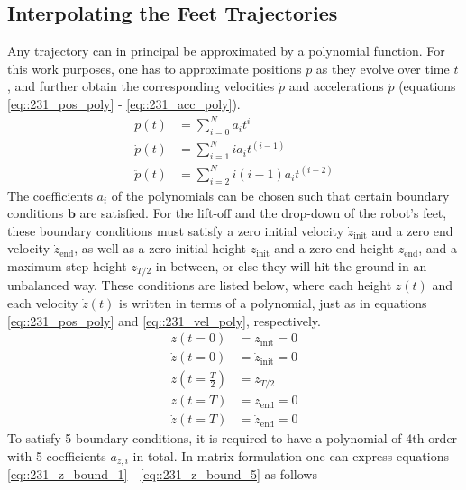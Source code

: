 \FloatBarrier
\subsection{Interpolating the Feet Trajectories}
Any trajectory can in principal be approximated by a polynomial function. For this work purposes, one has to approximate positions $p$ as they evolve over time $t$, and further obtain the corresponding velocities $\dot{p}$ and accelerations $\ddot{p}$ (equations \ref{eq::231_pos_poly} - \ref{eq::231_acc_poly}).  
\begin{align}
	p(t) &= \sum_{i = 0}^{N}a_it^i 
	\label{eq::231_pos_poly}\\
	\dot{p}(t) &= \sum_{i = 1}^{N}ia_it^{(i-1)} 
	\label{eq::231_vel_poly}\\
	\ddot{p}(t) &= \sum_{i = 2}^{N}i(i-1)a_it^{(i-2)}
	\label{eq::231_acc_poly}
\end{align}
The coefficients $a_i$ of the polynomials can be chosen such that certain boundary conditions $\bm{b}$ are satisfied. For the lift-off and the drop-down of the robot's feet, these boundary conditions must satisfy a zero initial velocity $\dot{z}_\text{init}$ and a zero end velocity $\dot{z}_\text{end}$, as well as a zero initial height $z_\text{init}$ and a zero end height $z_\text{end}$, and a maximum step height $z_{T/2}$ in between, or else they will hit the ground in an unbalanced way. These conditions are listed below, where each height $z(t)$ and each velocity $\dot{z}(t)$ is written in terms of a polynomial, just as in equations \ref{eq::231_pos_poly} and \ref{eq::231_vel_poly}, respectively. 
\begin{align}
	z(t = 0) &= z_\text{init} = 0
	\label{eq::231_z_bound_1} \\
	\dot{z}(t = 0) &= \dot{z}_\text{init} = 0 \\
	z(t = \frac{T}{2}) &= z_{T/2}
	\label{eq::231_step}\\  
	z(t = T) &= z_\text{end} = 0 \\
	\dot{z}(t = T) &= \dot{z}_\text{end} = 0 
	\label{eq::231_z_bound_5}
\end{align}
To satisfy 5 boundary conditions, it is required to have a polynomial of 4th order with 5 coefficients $a_{z,i}$ in total. In matrix formulation one can express equations \ref{eq::231_z_bound_1} - \ref{eq::231_z_bound_5} as follows
